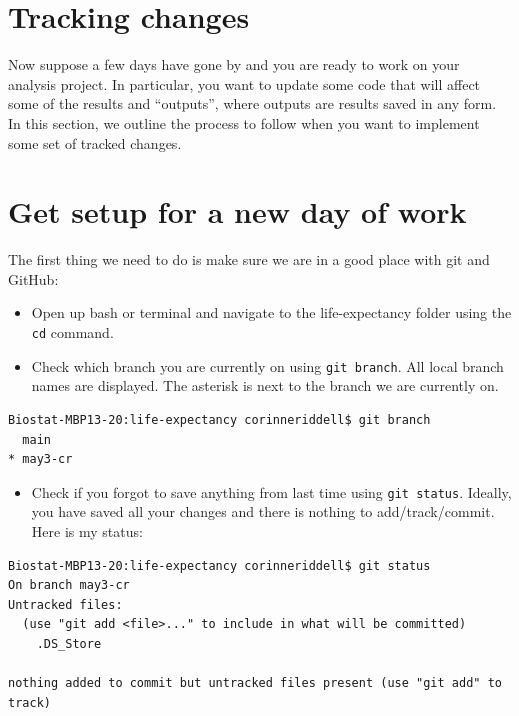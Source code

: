 \documentclass[
]{book}
\providecommand{\tightlist}{%
  \setlength{\itemsep}{0pt}\setlength{\parskip}{0pt}}
\begin{document}
\hypertarget{tracking-changes}{%
\section{Tracking changes}\label{tracking-changes}}

Now suppose a few days have gone by and you are ready to work on your analysis
project. In particular, you want to update some code that will affect some
of the results and ``outputs'', where outputs are results saved in any form. In
this section, we outline the process to follow when you want to implement some
set of tracked changes.

\hypertarget{get-setup-for-a-new-day-of-work}{%
\section{Get setup for a new day of work}\label{get-setup-for-a-new-day-of-work}}

The first thing we need to do is make sure we are in a good place with git and
GitHub:

\begin{itemize}
\tightlist
\item
  Open up bash or terminal and navigate to the life-expectancy folder using
  the \texttt{cd} command.
\item
  Check which branch you are currently on using \texttt{git\ branch}. All local branch
  names are displayed. The asterisk is next to the branch we are currently on.
\end{itemize}

\begin{verbatim}
Biostat-MBP13-20:life-expectancy corinneriddell$ git branch
  main
* may3-cr
\end{verbatim}

\begin{itemize}
\tightlist
\item
  Check if you forgot to save anything from last time using \texttt{git\ status}.
  Ideally, you have saved all your changes and there is nothing to add/track/commit.
  Here is my status:
\end{itemize}

\begin{verbatim}
Biostat-MBP13-20:life-expectancy corinneriddell$ git status
On branch may3-cr
Untracked files:
  (use "git add <file>..." to include in what will be committed)
    .DS_Store

nothing added to commit but untracked files present (use "git add" to track)
\end{verbatim}
\end{document}
